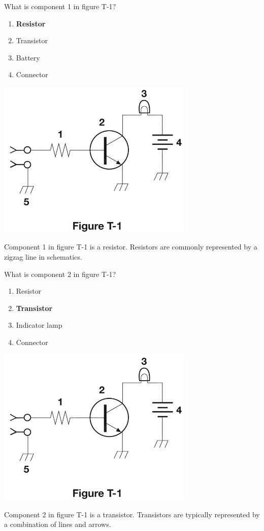 \begin{tcolorbox}[
    colback=gray!10!white,
    colframe=black!75!black,
    title={T6C02},
    sidebyside,
    sidebyside align=top,
    lefthand width=0.45\textwidth
]
What is component 1 in figure T-1?
\begin{enumerate}[label=\Alph*),noitemsep]
    \item \textbf{Resistor}
    \item Transistor
    \item Battery
    \item Connector
\end{enumerate}
\tcblower
\includegraphics[width=0.7\textwidth]{tech/images/t1.png}
\end{tcolorbox}
Component 1 in figure T-1 is a resistor. Resistors are commonly represented by a zigzag line in schematics.

\begin{tcolorbox}[
    colback=gray!10!white,
    colframe=black!75!black,
    title={T6C03},
    sidebyside,
    sidebyside align=top,
    lefthand width=0.45\textwidth
]
What is component 2 in figure T-1?
\begin{enumerate}[label=\Alph*),noitemsep]
    \item Resistor
    \item \textbf{Transistor}
    \item Indicator lamp
    \item Connector
\end{enumerate}
\tcblower
\includegraphics[width=0.7\textwidth]{tech/images/t1.png}
\end{tcolorbox}
Component 2 in figure T-1 is a transistor. Transistors are typically represented by a combination of lines and arrows.

